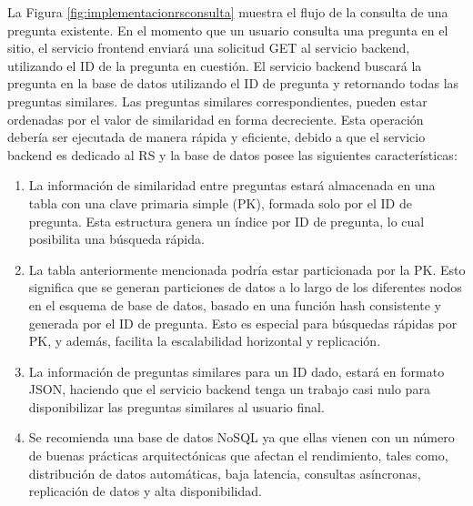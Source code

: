 La Figura \ref{fig:implementacionrsconsulta} muestra el flujo de la consulta de una pregunta existente. En el momento que un usuario consulta una pregunta en el sitio, el servicio frontend enviará una solicitud GET al servicio backend, utilizando el ID de la pregunta en cuestión. El servicio backend buscará la pregunta en la base de datos utilizando el ID de pregunta y retornando todas las preguntas similares. Las preguntas similares correspondientes, pueden estar ordenadas por el valor de similaridad en forma decreciente. Esta operación debería ser ejecutada de manera rápida y eficiente, debido a que el servicio backend es dedicado al RS y la base de datos posee las siguientes características:
\begin{enumerate}
	\item La información de similaridad entre preguntas estará almacenada en una tabla con una clave primaria simple (PK), formada solo por el ID de pregunta. Esta estructura genera un índice por ID de pregunta, lo cual posibilita una búsqueda rápida.
	\item La tabla anteriormente mencionada podría estar particionada por la PK. Esto significa que se generan particiones de datos a lo largo de los diferentes nodos en el esquema de base de datos, basado en una función hash consistente y generada por el ID de pregunta. Esto es especial para búsquedas rápidas por PK, y además, facilita la escalabilidad horizontal y replicación.
	\item La información de preguntas similares para un ID dado, estará en formato JSON, haciendo que el servicio backend tenga un trabajo casi nulo para disponibilizar las preguntas similares al usuario final.
	\item Se recomienda una base de datos NoSQL ya que ellas vienen con un número de buenas prácticas arquitectónicas que afectan el rendimiento, tales como, distribución de datos automáticas, baja latencia, consultas asíncronas, replicación de datos y alta disponibilidad.
\end{enumerate}

